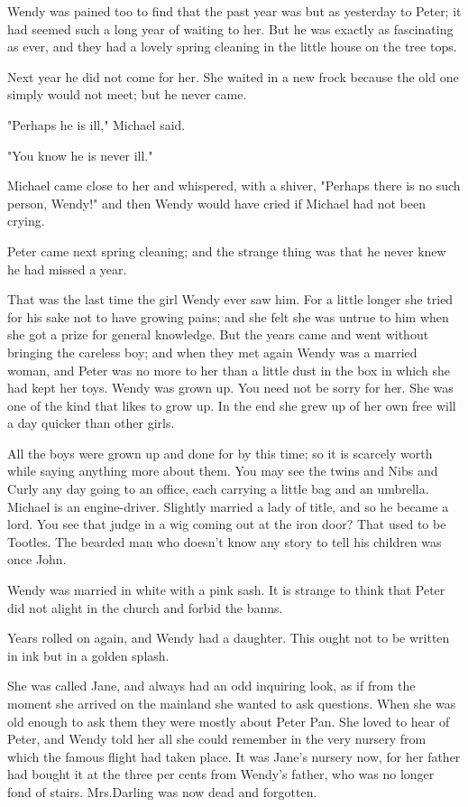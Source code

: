 Wendy was pained too to find that the past year was but as yesterday to Peter;
it had seemed such a long year of waiting to her.
But he was exactly as fascinating as ever, and they had a lovely spring cleaning in the little house on the tree tops.

Next year he did not come for her.
She waited in a new frock because the old one simply would not meet;
but he never came.

"Perhaps he is ill," Michael said.

"You know he is never ill."

Michael came close to her and whispered, with a shiver, "Perhaps there is no such person, Wendy!\@" and then Wendy would have cried if Michael had not been crying.

Peter came next spring cleaning;
and the strange thing was that he never knew he had missed a year.

That was the last time the girl Wendy ever saw him.
For a little longer she tried for his sake not to have growing pains;
and she felt she was untrue to him when she got a prize for general knowledge.
But the years came and went without bringing the careless boy;
and when they met again Wendy was a married woman, and Peter was no more to her than a little dust in the box in which she had kept her toys.
Wendy was grown up.
You need not be sorry for her.
She was one of the kind that likes to grow up.
In the end she grew up of her own free will a day quicker than other girls.

All the boys were grown up and done for by this time;
so it is scarcely worth while saying anything more about them.
You may see the twins and Nibs and Curly any day going to an office, each carrying a little bag and an umbrella.
Michael is an engine-driver.
Slightly married a lady of title, and so he became a lord.
You see that judge in a wig coming out at the iron door?
That used to be Tootles.
The bearded man who doesn't know any story to tell his children was once John.

Wendy was married in white with a pink sash.
It is strange to think that Peter did not alight in the church and forbid the banns.

Years rolled on again, and Wendy had a daughter.
This ought not to be written in ink but in a golden splash.

She was called Jane, and always had an odd inquiring look, as if from the moment she arrived on the mainland she wanted to ask questions.
When she was old enough to ask them they were mostly about Peter Pan.
She loved to hear of Peter, and Wendy told her all she could remember in the very nursery from which the famous flight had taken place.
It was Jane's nursery now, for her father had bought it at the three per cents from Wendy's father, who was no longer fond of stairs.
Mrs.\@ Darling was now dead and forgotten.


